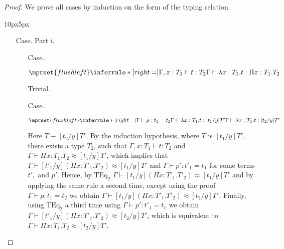 \begin{proof}
  We prove all cases by induction on the form of the typing relation.
  \vspace{-25px}
\begin{changemargin}{10px}{5px}\noindent
\begin{itemize}
\item[Case.] Part i.\\
  \vspace{-30px}
  \begin{itemize}
  \item[Case.] \ \\
    \begin{center}
      \begin{math}
        $$\mprset{flushleft}
        \inferrule* [right=] {
          \Gamma,x : T_1 \vdash t : T_2
        }{\Gamma \vdash \lambda x : T_1.t : \Pi x:T_1.T_2}
      \end{math}
    \end{center}
    Trivial.
  
  \item[Case.] \ \\
    \begin{center}
      \begin{math}
        $$\mprset{flushleft}
        \inferrule* [right=] {
          \Gamma \vdash p:t_1 = t_2
          \\
          \Gamma \vdash \lambda x : T_1.t:[t_1/y]T'
        }{\Gamma \vdash \lambda x : T_1.t:[t_2/y]T'}
      \end{math}
    \end{center}
    Here $T \equiv [t_2/y]T'$.  By the induction hypothesis, where $T$ is 
    $[t_1/y]T'$, there exists a type $T_2$, such that $\Gamma,x:T_1 \vdash t:T_2$ and
    $\Gamma \vdash \Pi x:T_1.T_2 \approx [t_1/y]T'$, which implies that 
    $\Gamma \vdash [t'_1/y](\Pi x:T'_1.T'_2) \approx [t_1/y]T'$ and
    $\Gamma \vdash p':t'_1 = t_1$ for some terms $t'_1$ and $p'$.  Hence, by $\text{TEq}_2$
    $\Gamma \vdash [t_1/y](\Pi x:T'_1.T'_2) \approx [t_1/y]T'$ and by applying the same
    rule a second time, except using the proof $\Gamma \vdash p:t_1 = t_2$ we obtain
    $\Gamma \vdash [t_1/y](\Pi x:T'_1.T'_2) \approx [t_2/y]T'$.  Finally, using 
    $\text{TEq}_2$ a third time using $\Gamma \vdash p':t'_1 = t_1$ we obtain
    $\Gamma \vdash [t'_1/y](\Pi x:T'_1.T'_2) \approx [t_2/y]T'$, which is equivalent to
    $\Gamma \vdash \Pi x:T_1.T_2 \approx [t_2/y]T'$.
  \end{itemize}
  

\end{itemize}
\end{changemargin}
\end{proof}
